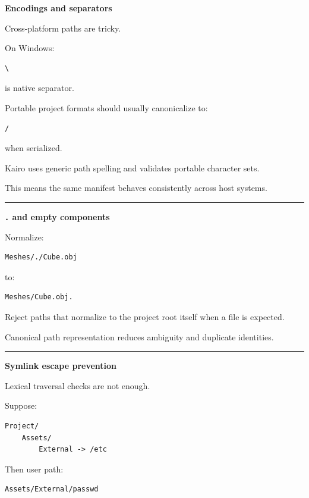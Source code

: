\textbf{Encodings and separators}

Cross-platform paths are tricky.

On Windows:

\begin{verbatim}
\
\end{verbatim}

is native separator.

Portable project formats should usually canonicalize to:

\begin{verbatim}
/
\end{verbatim}

when serialized.

Kairo uses generic path spelling and validates portable character sets.

This means the same manifest behaves consistently across host systems.

\begin{center}\rule{0.5\linewidth}{0.5pt}\end{center}

\textbf{\texttt{.} and empty components}

Normalize:

\begin{verbatim}
Meshes/./Cube.obj
\end{verbatim}

to:

\begin{verbatim}
Meshes/Cube.obj.
\end{verbatim}

Reject paths that normalize to the project root itself when a file is expected.

Canonical path representation reduces ambiguity and duplicate identities.

\begin{center}\rule{0.5\linewidth}{0.5pt}\end{center}

\textbf{Symlink escape prevention}

Lexical traversal checks are not enough.

Suppose:

\begin{verbatim}
Project/
    Assets/
        External -> /etc
\end{verbatim}

Then user path:

\begin{verbatim}
Assets/External/passwd
\end{verbatim}

